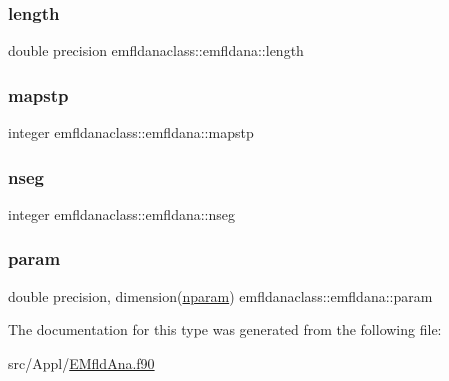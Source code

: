 \subsubsection{\texorpdfstring{length}{length}}
{\footnotesize\ttfamily double precision emfldanaclass\+::emfldana\+::length}

\mbox{\label{structemfldanaclass_1_1emfldana_a4db12b7d942f212750921af22cc57a48}} 
\subsubsection{\texorpdfstring{mapstp}{mapstp}}
{\footnotesize\ttfamily integer emfldanaclass\+::emfldana\+::mapstp}

\mbox{\label{structemfldanaclass_1_1emfldana_a9c550d5110930bddd92a57c1d9809e66}} 
\subsubsection{\texorpdfstring{nseg}{nseg}}
{\footnotesize\ttfamily integer emfldanaclass\+::emfldana\+::nseg}

\mbox{\label{structemfldanaclass_1_1emfldana_a5d95e09d4f314af58ac2b9b0ecbdaa94}} 
\subsubsection{\texorpdfstring{param}{param}}
{\footnotesize\ttfamily double precision, dimension(\mbox{\hyperlink{namespaceemfldanaclass_a3ce28adb644b4d35b7f3e9713a275828}{nparam}}) emfldanaclass\+::emfldana\+::param}



The documentation for this type was generated from the following file\+:\begin{DoxyCompactItemize}
\item 
src/\+Appl/\mbox{\hyperlink{_e_mfld_ana_8f90}{E\+Mfld\+Ana.\+f90}}\end{DoxyCompactItemize}
